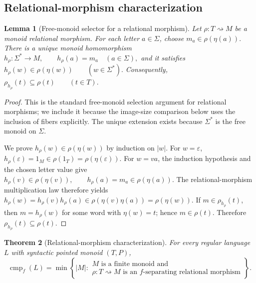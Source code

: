 \documentclass[10pt,a4paper]{article}
\newtheorem{theorem}{Theorem}[section]
\newtheorem{lemma}[theorem]{Lemma}
\theoremstyle{definition}
\theoremstyle{remark}
\newcommand{\cmp}{\operatorname{cmp}}
\newcommand{\relto}{\mathrel{\rightsquigarrow}}
\begin{document}
\subsection{Relational-morphism characterization}

\begin{lemma}[Free-monoid selector for a relational morphism]
\label{alg:lem:selector}
Let \(\rho:T\relto M\) be a monoid relational morphism.  For each letter
\(a\in\Sigma\), choose
\(m_a\in\rho(\eta(a)).\)
There is a unique monoid homomorphism
\(h_\rho:\Sigma^*\to M, \qquad h_\rho(a)=m_a\quad(a\in\Sigma),\)
and it satisfies
\(h_\rho(w)\in\rho(\eta(w)) \qquad(w\in\Sigma^*).\)
Consequently,
\(\rho_{h_\rho}(t)\subseteq\rho(t) \qquad(t\in T).\)
\end{lemma}

\begin{proof}
This is the standard free-monoid selection argument for relational morphisms;
we include it because the image-size comparison below uses the inclusion of
fibers explicitly.  The unique extension exists because \(\Sigma^*\) is the
free monoid on \(\Sigma\).

We prove
\(h_\rho(w)\in\rho(\eta(w))\)
by induction on \(|w|\).  For \(w=\varepsilon\),
\(h_\rho(\varepsilon)=1_M\in\rho(1_T)=\rho(\eta(\varepsilon)).\)
For \(w=va\), the induction hypothesis and the chosen letter value give
\(h_\rho(v)\in\rho(\eta(v)), \qquad h_\rho(a)=m_a\in\rho(\eta(a)).\)
The relational-morphism multiplication law therefore yields
\(h_\rho(w) =h_\rho(v)h_\rho(a) \in\rho(\eta(v)\eta(a)) =\rho(\eta(w)).\)
If \(m\in\rho_{h_\rho}(t)\), then \(m=h_\rho(w)\) for some word with
\(\eta(w)=t\); hence \(m\in\rho(t)\).  Therefore
\(\rho_{h_\rho}(t)\subseteq\rho(t).\)
\end{proof}

\begin{theorem}[Relational-morphism characterization]
\label{alg:thm:relational-characterization}
For every regular language \(L\) with syntactic pointed monoid \((T,P)\),
\[
\cmp_f(L)
=
\min\left\{
|M|:
\begin{array}{l}
M\text{ is a finite monoid and}\\
\rho:T\relto M\text{ is an \(f\)-separating relational morphism}
\end{array}
\right\}.
\]
\end{theorem}
\end{document}

